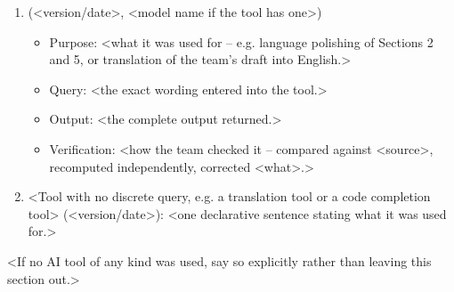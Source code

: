 \documentclass[12pt]{article}            %
\theoremstyle{definition}
\theoremstyle{remark}
\begin{document}
\begin{enumerate}[leftmargin=*]
  \item <Tool name> (<version/date>, <model name if the tool has one>)
        \begin{itemize}[nosep]
          \item Purpose: <what it was used for -- e.g. language polishing of
                Sections 2 and 5, or translation of the team's draft into English.>
          \item Query: <the exact wording entered into the tool.>
          \item Output: <the complete output returned.>
          \item Verification: <how the team checked it -- compared against
                <source>, recomputed independently, corrected <what>.>
        \end{itemize}
  \item <Tool with no discrete query, e.g. a translation tool or a code
        completion tool> (<version/date>): <one declarative sentence stating
        what it was used for.>
\end{enumerate}

\noindent <If no AI tool of any kind was used, say so explicitly rather than
leaving this section out.>

\end{document}
